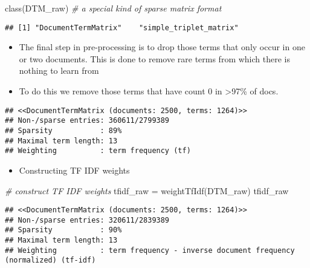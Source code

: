 \documentclass[
  12pt,
]{article}
\newenvironment{Shaded}{\begin{snugshade}}{\end{snugshade}}
\newcommand{\AttributeTok}[1]{\textcolor[rgb]{0.77,0.63,0.00}{#1}}
\newcommand{\CommentTok}[1]{\textcolor[rgb]{0.56,0.35,0.01}{\textit{#1}}}
\newcommand{\ConstantTok}[1]{\textcolor[rgb]{0.00,0.00,0.00}{#1}}
\newcommand{\DecValTok}[1]{\textcolor[rgb]{0.00,0.00,0.81}{#1}}
\newcommand{\FunctionTok}[1]{\textcolor[rgb]{0.00,0.00,0.00}{#1}}
\newcommand{\NormalTok}[1]{#1}
\newcommand{\OtherTok}[1]{\textcolor[rgb]{0.56,0.35,0.01}{#1}}
\newcommand{\SpecialCharTok}[1]{\textcolor[rgb]{0.00,0.00,0.00}{#1}}
\providecommand{\tightlist}{%
  \setlength{\itemsep}{0pt}\setlength{\parskip}{0pt}}
\begin{document}
\begin{Shaded}
\begin{Highlighting}[]
\FunctionTok{class}\NormalTok{(DTM\_raw)  }\CommentTok{\# a special kind of sparse matrix format}
\end{Highlighting}
\end{Shaded}

\begin{verbatim}
## [1] "DocumentTermMatrix"    "simple_triplet_matrix"
\end{verbatim}

\begin{itemize}
\item
  The final step in pre-processing is to drop those terms that only
  occur in one or two documents. This is done to remove rare terms from
  which there is nothing to learn from
\item
  To do this we remove those terms that have count 0 in \textgreater97\%
  of docs.
\end{itemize}

\begin{verbatim}
## <<DocumentTermMatrix (documents: 2500, terms: 1264)>>
## Non-/sparse entries: 360611/2799389
## Sparsity           : 89%
## Maximal term length: 13
## Weighting          : term frequency (tf)
\end{verbatim}

\begin{itemize}
\tightlist
\item
  Constructing TF IDF weights
\end{itemize}

\begin{Shaded}
\begin{Highlighting}[]
\CommentTok{\# construct TF IDF weights}
\NormalTok{tfidf\_raw }\OtherTok{=} \FunctionTok{weightTfIdf}\NormalTok{(DTM\_raw)}
\NormalTok{tfidf\_raw}
\end{Highlighting}
\end{Shaded}

\begin{verbatim}
## <<DocumentTermMatrix (documents: 2500, terms: 1264)>>
## Non-/sparse entries: 320611/2839389
## Sparsity           : 90%
## Maximal term length: 13
## Weighting          : term frequency - inverse document frequency (normalized) (tf-idf)
\end{verbatim}

\begin{Shaded}
\end{Shaded}
\end{document}
